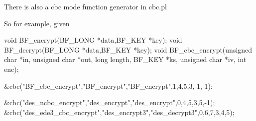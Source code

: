 There is also a cbc mode function generator in cbc.\+pl 
 So for example, given \begin{DoxyVerb}void BF_encrypt(BF_LONG *data,BF_KEY *key);
void BF_decrypt(BF_LONG *data,BF_KEY *key);
void BF_cbc_encrypt(unsigned char *in, unsigned char *out, long length,
                    BF_KEY *ks, unsigned char *iv, int enc);

&cbc("BF_cbc_encrypt","BF_encrypt","BF_encrypt",1,4,5,3,-1,-1);

&cbc("des_ncbc_encrypt","des_encrypt","des_encrypt",0,4,5,3,5,-1);
&cbc("des_ede3_cbc_encrypt","des_encrypt3","des_decrypt3",0,6,7,3,4,5);
\end{DoxyVerb}
 